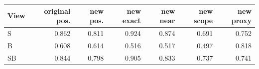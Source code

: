 \begin{tabular}{lrrrrrr}
\toprule
View & original pos. & new pos. & new exact & new near & new scope & new proxy\\
\midrule
S & 0.862 & 0.811 & 0.924 & 0.874 & 0.691 & 0.752\\
B & 0.608 & 0.614 & 0.516 & 0.517 & 0.497 & 0.818\\
SB & 0.844 & 0.798 & 0.905 & 0.833 & 0.737 & 0.741\\
\bottomrule
\end{tabular}
